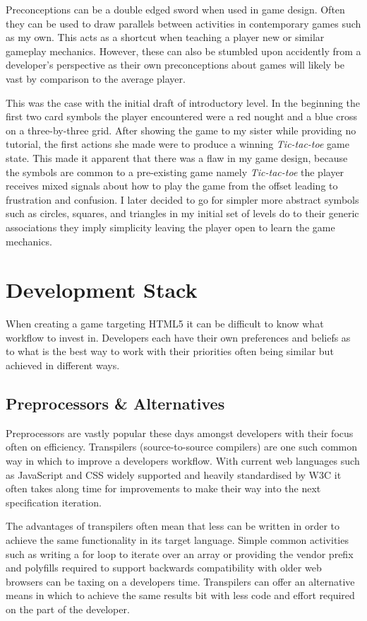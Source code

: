 \documentclass[final]{cmpreport}
\begin{document}
Preconceptions can be a double edged sword when used in game design. Often they can be used to draw parallels between activities in contemporary games such as my own. This acts as a shortcut when teaching a player new or similar gameplay mechanics. However, these can also be stumbled upon accidently from a developer's perspective as their own preconceptions about games will likely be vast by comparison to the average player.

This was the case with the initial draft of introductory level. In the beginning the first two card symbols the player encountered were a red nought and a blue cross on a three-by-three grid. After showing the game to my sister while providing no tutorial, the first actions she made were to produce a winning \emph{Tic-tac-toe} game state. This made it apparent that there was a flaw in my game design, because the symbols are common to a pre-existing game namely \emph{Tic-tac-toe} the player receives mixed signals about how to play the game from the offset leading to frustration and confusion. I later decided to go for simpler more abstract symbols such as circles, squares, and triangles in my initial set of levels do to their generic associations they imply simplicity leaving the player open to learn the game mechanics.

\section{Development Stack}
When creating a game targeting HTML5 it can be difficult to know what workflow to invest in. Developers each have their own preferences and beliefs as to what is the best way to work with their priorities often being similar but achieved in different ways.

\subsection{Preprocessors \& Alternatives}
Preprocessors are vastly popular these days amongst developers with their focus often on efficiency. Transpilers (source-to-source compilers) are one such common way in which to improve a developers workflow. With current web languages such as JavaScript and CSS widely supported and heavily standardised by W3C it often takes along time for improvements to make their way into the next specification iteration.

The advantages of transpilers often mean that less can be written in order to achieve the same functionality in its target language. Simple common activities such as writing a for loop to iterate over an array or providing the vendor prefix and polyfills required to support backwards compatibility with older web browsers can be taxing on a developers time. Transpilers can offer an alternative means in which to achieve the same results bit with less code and effort required on the part of the developer.
\end{document}
